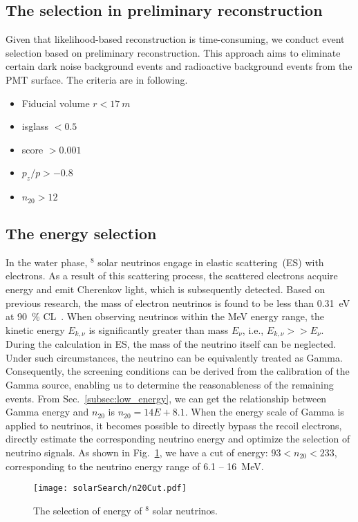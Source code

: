 \subsection{The selection in preliminary reconstruction}
Given that likelihood-based reconstruction is time-consuming, we conduct event selection based on preliminary reconstruction. This approach aims to eliminate certain dark noise background events and radioactive background events from the PMT surface. The criteria are in following.
\begin{itemize}
	\item Fiducial volume $r < \SI{17}{m}$
	\item isglass $< 0.5$
	\item score $>0.001$
	\item $p_z/p>-0.8$
	\item $n_{20}>12$
\end{itemize}

\subsection{The energy selection}
In the water phase, $^8$ solar neutrinos engage in elastic scattering~(ES) with electrons. As a result of this scattering process, the scattered electrons acquire energy and emit Cherenkov light, which is subsequently detected. Based on previous research, the mass of electron neutrinos is found to be less than \SI{0.31}{eV} at \SI{90}{\%} CL~\cite{KATRIN}. When observing neutrinos within the \si{MeV} energy range, the kinetic energy \(E_{k,\nu}\) is significantly greater than mass \(E_{\nu}\), i.e., \(E_{k,\nu} >> E_{\nu}\). During the calculation in ES, the mass of the neutrino itself can be neglected. Under such circumstances, the neutrino can be equivalently treated as Gamma. Consequently, the screening conditions can be derived from the calibration of the Gamma source, enabling us to determine the reasonableness of the remaining events.
From Sec.~\ref{subsec:low_energy}, we can get the relationship between Gamma energy and $n_{20}$ is $n_{20}=14E+8.1$. When the energy scale of Gamma is applied to neutrinos, it becomes possible to directly bypass the recoil electrons, directly estimate the corresponding neutrino energy and optimize the selection of neutrino signals.
As shown in Fig.~\ref{fig:solar_n20_select}, we have a cut of energy: $93<n_{20}<233$, corresponding to the neutrino energy range of 6.1 -- \SI{16}{MeV}.
\begin{figure}[htbp]
	\centering
	\texttt{[image: solarSearch/n20Cut.pdf]}
	\caption{The selection of energy of $^8$ solar neutrinos.}
	\label{fig:solar_n20_select}
\end{figure}

